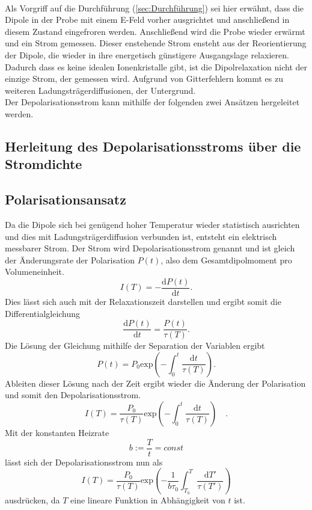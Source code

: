 \\ 
Als Vorgriff auf die Durchführung (\ref{sec:Durchführung}) sei hier erwähnt, dass die Dipole in der Probe
mit einem E-Feld vorher ausgrichtet und anschließend in diesem Zustand eingefroren werden. Anschließend
wird die Probe wieder erwärmt und ein Strom gemessen. Dieser enstehende Strom ensteht aus der Reorientierung
der Dipole, die wieder in ihre energetisch günstigere Ausgangslage relaxieren. Dadurch dass es keine idealen Ionenkristalle
gibt, ist die Dipolrelaxation nicht der einzige Strom, der gemessen wird. Aufgrund von Gitterfehlern kommt es zu weiteren
Ladungsträgerdiffusionen, der Untergrund. \\
Der Depolarisationsstrom kann mithilfe der folgenden zwei Ansätzen hergeleitet werden.

\subsection{Herleitung des Depolarisationsstroms über die Stromdichte}
\label{Subsec:HerStromdichte}



\subsection{Polarisationsansatz}
\label{subsec:polarisation}

Da die Dipole sich bei genügend hoher Temperatur wieder statistisch ausrichten und dies mit Ladungsträgerdiffusion verbunden ist,
entsteht ein elektrisch messbarer Strom.
Der Strom wird Depolarisationsstrom genannt und ist gleich der Änderungsrate der 
Polarisation $P(t)$, also dem Gesamtdipolmoment pro Volumeneinheit.
\begin{equation}
    I(T) = - \frac{\text{d}P(t)}{\text{d}t}.
\end{equation}
Dies lässt sich auch mit der Relaxationszeit darstellen und ergibt somit die Differentialgleichung
\begin{equation}
    \frac{\text{d} P(t)}{\text{d} t} = \frac{P(t)}{\tau(T)}.
    \label{eqn:diff}
\end{equation}
Die Lösung der Gleichung mithilfe der Separation der Variablen ergibt
\begin{equation}
    P(t) = P_0 \text{exp}\left(-\int_0^t\frac{\text{d}t}{\tau(T)}\right).
\end{equation}
Ableiten dieser Lösung nach der Zeit ergibt wieder die Änderung der Polarisation und somit den 
Depolarisationsstrom.
\begin{equation}
    I(T) = \frac{P_0}{\tau(T)} \text{exp}\left(-\int_0^t\frac{\text{d}t}{\tau(T)}\right) \quad.
    \end{equation}
Mit der konstanten Heizrate
\begin{equation}
    b := \frac{T}{t} = const
\end{equation}
lässt sich der Depolarisationsstrom nun als 
\begin{equation}
    I(T) = \frac{P_0}{\tau(T)} \text{exp}\left(-\frac{1}{b\tau_0}\int_{T_0}^T\frac{\text{d}T'}{\tau(T')}\right)
\end{equation}
ausdrücken, da $T$ eine lineare Funktion in Abhängigkeit von $t$ ist.

